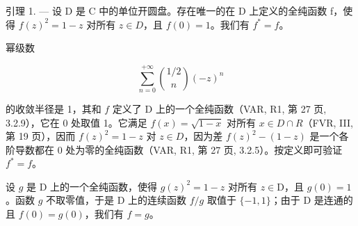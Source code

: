 引理 1. --- 设 D 是 C 中的单位开圆盘。存在唯一的在 D 上定义的全纯函数 f，使得 \(f(z)^{2} = 1 - z\) 对所有 \(z \in D\)，且 \(f(0) = 1\)。我们有 \(f^{*} = f\)。

幂级数

\[
\sum_ {n = 0} ^ {+ \infty} \binom {1 / 2} {n} (- z) ^ {n}
\]

的收敛半径是 1，其和 \(f\) 定义了 D 上的一个全纯函数（VAR, R1, 第 27 页, 3.2.9），它在 0 处取值 1。它满足 \(f(x)=\sqrt{1-x}\) 对所有 \(x \in D \cap R\)（FVR, III, 第 19 页），因而 \(f(z)^{2} = 1 - z\) 对 \(z \in D\)，因为差 \(f(z)^{2} - (1 - z)\) 是一个各阶导数都在 0 处为零的全纯函数（VAR, R1, 第 27 页, 3.2.5）。按定义即可验证 \(f^{*} = f\)。

设 \(g\) 是 D 上的一个全纯函数，使得 \(g(z)^2 = 1 - z\) 对所有 \(z \in \mathrm{D}\)，且 \(g(0) = 1\)。函数 \(g\) 不取零值，于是 D 上的连续函数 \(f / g\) 取值于 \(\{-1, 1\}\)；由于 D 是连通的且 \(f(0) = g(0)\)，我们有 \(f = g\)。